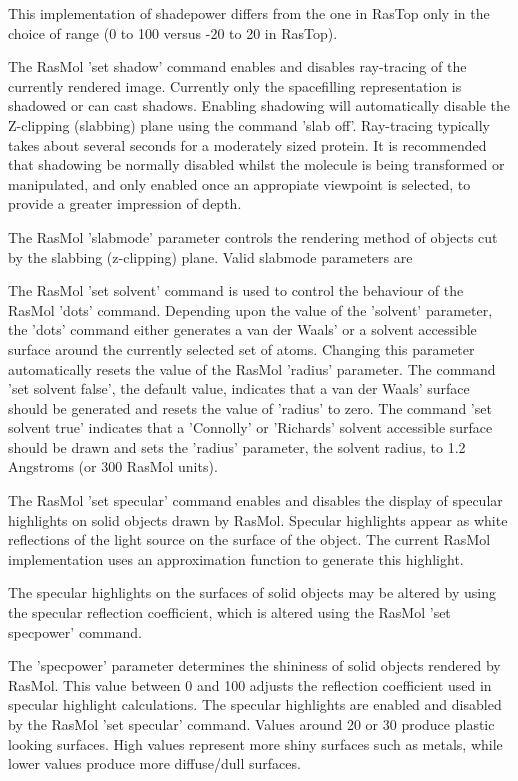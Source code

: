This implementation of shadepower differs from the one in RasTop
only in the choice of range (0 to 100 versus -20 to 20 in RasTop).

The RasMol
'set shadow'
command enables and disables ray-tracing of the currently rendered image.
Currently only the spacefilling representation is shadowed or can cast
shadows. Enabling shadowing will automatically disable the Z-clipping
(slabbing) plane using the command
'slab off'.
Ray-tracing typically takes about several seconds for a moderately sized protein.
It is recommended that shadowing be normally disabled whilst the
molecule is being transformed or manipulated, and only enabled once
an appropiate viewpoint is selected, to provide a greater impression
of depth.

The RasMol
'slabmode'
parameter controls the rendering method of objects cut by the
slabbing (z-clipping) plane. Valid slabmode parameters are

The RasMol
'set solvent'
command is used to control the behaviour of the RasMol
'dots'
command. Depending upon the value of the
'solvent'
parameter, the
'dots'
command either generates a van der Waals' or a solvent
accessible surface around the currently selected set of
atoms. Changing this parameter automatically resets the
value of the RasMol
'radius'
parameter.
The command
'set solvent false',
the default value, indicates that a van der Waals' surface
should be generated and resets the value of
'radius'
to zero. The command
'set solvent true'
indicates that a 'Connolly' or 'Richards' solvent
accessible surface should be drawn and sets the
'radius'
parameter, the solvent radius, to 1.2 Angstroms (or 300
RasMol units).

The RasMol
'set specular'
command enables and disables the display of specular highlights on
solid objects drawn by RasMol. Specular highlights appear as white
reflections of the light source on the surface of the object. The
current RasMol implementation uses an approximation function to
generate this highlight.

The specular highlights on the surfaces of solid objects may be
altered by using the specular reflection coefficient, which is
altered using the RasMol
'set specpower'
command.

The
'specpower'
parameter determines the shininess of solid objects rendered by
RasMol. This value between 0 and 100 adjusts the reflection
coefficient used in specular highlight calculations. The specular
highlights are enabled and disabled by the RasMol
'set specular'
command. Values around 20 or 30 produce plastic looking surfaces.
High values represent more shiny surfaces such as metals, while
lower values produce more diffuse/dull surfaces.

